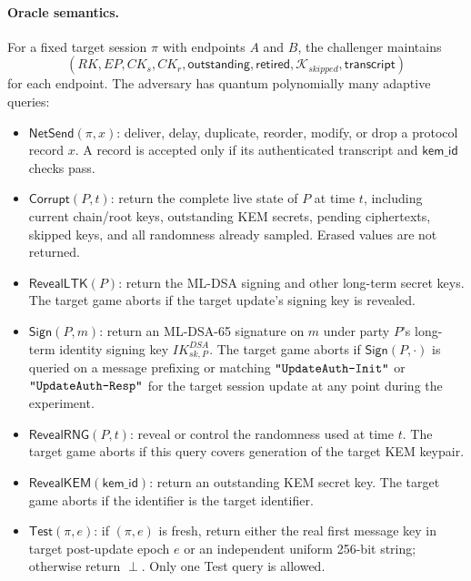 \documentclass[11pt,a4paper]{article}
\theoremstyle{remark}
\theoremstyle{plain}
\newcommand{\strlit}[1]{\text{\upshape\texttt{"#1"}}}
\begin{document}
\paragraph{Oracle semantics.}
For a fixed target session $\pi$ with endpoints $A$ and $B$, the challenger maintains
\[
  (RK,EP,CK_s,CK_r,\mathsf{outstanding},\mathsf{retired},
    \mathcal{K}_{skipped},\mathsf{transcript})
\]
for each endpoint.  The adversary has quantum polynomially many adaptive queries:
\begin{itemize}
  \item $\mathsf{NetSend}(\pi,x)$: deliver, delay, duplicate, reorder, modify, or drop a
        protocol record $x$.  A record is accepted only if its authenticated transcript and
        $\mathsf{kem\_id}$ checks pass.
  \item $\mathsf{Corrupt}(P,t)$: return the complete live state of $P$ at time $t$, including
        current chain/root keys, outstanding KEM secrets, pending ciphertexts, skipped keys,
        and all randomness already sampled.  Erased values are not returned.
  \item $\mathsf{RevealLTK}(P)$: return the ML-DSA signing and other long-term secret keys.
        The target game aborts if the target update's signing key is revealed.
  \item $\mathsf{Sign}(P, m)$: return an ML-DSA-65 signature on $m$ under party $P$'s long-term identity
        signing key $IK^{DSA}_{sk,P}$.  The target game aborts if $\mathsf{Sign}(P, \cdot)$ is queried on a message
        prefixing or matching $\strlit{UpdateAuth-Init}$ or $\strlit{UpdateAuth-Resp}$ for the target session update
        at any point during the experiment.
  \item $\mathsf{RevealRNG}(P,t)$: reveal or control the randomness used at time $t$.  The
        target game aborts if this query covers generation of the target KEM keypair.
  \item $\mathsf{RevealKEM}(\mathsf{kem\_id})$: return an outstanding KEM secret key.  The
        target game aborts if the identifier is the target identifier.
  \item $\mathsf{Test}(\pi,e)$: if $(\pi,e)$ is fresh, return either the real first message
        key in target post-update epoch $e$ or an independent uniform 256-bit string;
        otherwise return $\perp$.  Only one Test query is allowed.
\end{itemize}
\end{document}
